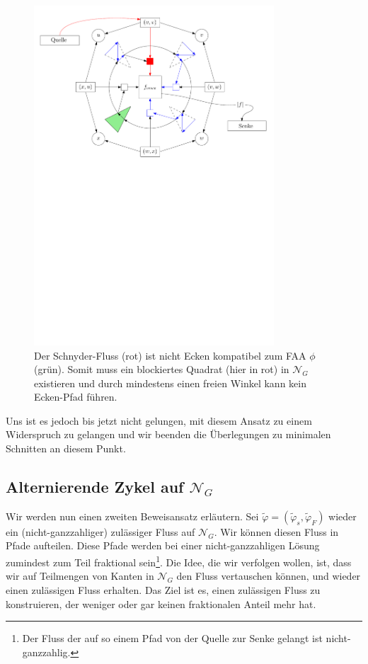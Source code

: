 \begin{figure}
	\centering
  	\includegraphics[width=0.8\textwidth]{combined_face_not_corner.pdf}
  	\caption{Der Schnyder-Fluss (rot) ist nicht Ecken kompatibel zum FAA $\phi$ (grün). Somit muss ein blockiertes Quadrat (hier in rot) in $\mathcal{N}_G$ existieren und durch mindestens einen freien Winkel kann kein Ecken-Pfad führen.}
	\label{combined_face_not_corner}
\end{figure}

Uns ist es jedoch bis jetzt nicht gelungen, mit diesem Ansatz zu einem Widerspruch zu gelangen und wir beenden die Überlegungen zu minimalen Schnitten an diesem Punkt.

\subsection{Alternierende Zykel auf $\mathcal{N}_G$}

Wir werden nun einen zweiten Beweisansatz erläutern. Sei $\tilde{\varphi}=(\tilde{\varphi}_s,\tilde{\varphi}_F)$ wieder ein (nicht-ganzzahliger) zulässiger Fluss auf $\mathcal{N}_G$. Wir können diesen Fluss in Pfade aufteilen. Diese Pfade werden bei einer nicht-ganzzahligen Lösung zumindest zum Teil fraktional sein\footnote{Der Fluss der auf so einem Pfad von der Quelle zur Senke gelangt ist nicht-ganzzahlig.}. Die Idee, die wir verfolgen wollen, ist, dass wir auf Teilmengen von Kanten in $\mathcal{N}_G$ den Fluss vertauschen können, und wieder einen zulässigen Fluss erhalten. Das Ziel ist es, einen zulässigen Fluss zu konstruieren, der weniger oder gar keinen fraktionalen Anteil mehr hat.

